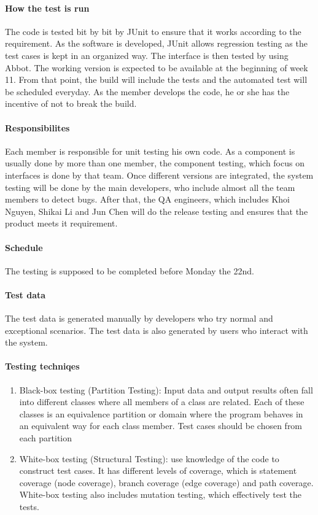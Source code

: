 \documentclass[11pt, a4paper]{report}
\begin{document}
\paragraph{How the test is run}
The code is tested bit by bit by JUnit to ensure that it works according to the requirement. As the software is developed, JUnit allows regression testing as the test cases is kept in an organized way.  The interface is then tested by using Abbot. The working version is expected to be available at the beginning of week 11. From that point, the build will include the tests and the automated test will be scheduled everyday. As the member develops the code, he or she has the incentive of not to break the build.   
\paragraph{Responsibilites}
Each member is responsible for unit testing his own code. As a component is usually done by more than one member, the component testing, which focus on interfaces is done by that team. Once different versions are integrated, the system testing will be done by the main developers, who include almost all the team members to detect bugs. After that, the QA engineers, which includes Khoi Nguyen, Shikai Li and Jun Chen will do the release testing and ensures that the product meets it requirement.
\paragraph{Schedule}
The testing is supposed to be completed before Monday the 22nd.
\paragraph{Test data}
The test data is generated manually by developers who try normal and exceptional scenarios. The test data is also generated by users who interact with the system.
\paragraph{Testing techniqes}
\begin{enumerate}
  \item Black-box testing (Partition Testing): Input data and output results often fall into different classes where all members of a class are related. Each of these classes is an equivalence partition or domain where the program behaves in an equivalent way for each class member.  Test cases should be chosen from each partition
	\item White-box testing (Structural Testing): use knowledge of the code to construct test cases. It has different levels of coverage, which is statement coverage (node coverage), branch coverage (edge coverage) and path coverage. White-box testing also includes mutation testing, which effectively test the tests.	
\end{enumerate}
\end{document}
